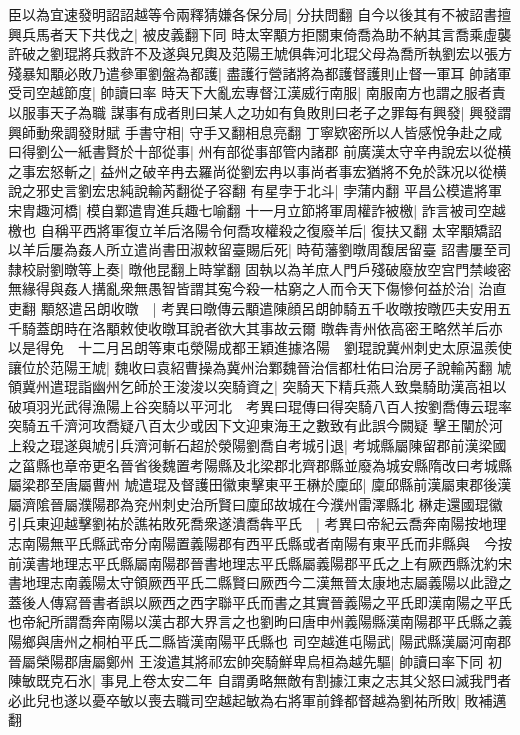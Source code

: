 臣以為宜速發明詔詔越等令兩釋猜嫌各保分局|{
	分扶問翻}
自今以後其有不被詔書擅興兵馬者天下共伐之|{
	被皮義翻下同}
時太宰顒方拒關東倚喬為助不納其言喬乘虛襲許破之劉琨將兵救許不及遂與兄輿及范陽王虓俱犇河北琨父母為喬所執劉宏以張方殘暴知顒必敗乃遣參軍劉盤為都護|{
	盡護行營諸將為都護督護則止督一軍耳}
帥諸軍受司空越節度|{
	帥讀曰率}
時天下大亂宏專督江漢威行南服|{
	南服南方也謂之服者責以服事天子為職}
謀事有成者則曰某人之功如有負敗則曰老子之罪每有興發|{
	興發謂興師動衆調發財賦}
手書守相|{
	守手又翻相息亮翻}
丁寧欵密所以人皆感悅争赴之咸曰得劉公一紙書賢於十部從事|{
	州有部從事部管内諸郡}
前廣漢太守辛冉說宏以從横之事宏怒斬之|{
	益州之破辛冉去羅尚從劉宏冉以事尚者事宏猶將不免於誅况以從横說之邪史言劉宏忠純說輸芮翻從子容翻}
有星孛于北斗|{
	孛蒲内翻}
平昌公模遣將軍宋胄趣河橋|{
	模自鄴遣胄進兵趣七喻翻}
十一月立節將軍周權詐被檄|{
	詐言被司空越檄也}
自稱平西將軍復立羊后洛陽令何喬攻權殺之復廢羊后|{
	復扶又翻}
太宰顒矯詔以羊后屢為姦人所立遣尚書田淑敕留臺賜后死|{
	時荀藩劉暾周馥居留臺}
詔書屢至司隸校尉劉暾等上奏|{
	暾他昆翻上時掌翻}
固執以為羊庶人門戶殘破廢放空宫門禁峻密無緣得與姦人搆亂衆無愚智皆謂其寃今殺一枯窮之人而令天下傷慘何益於治|{
	治直吏翻}
顒怒遣呂朗收暾　|{
	考異曰暾傳云顒遣陳顔呂朗帥騎五千收暾按暾匹夫安用五千騎蓋朗時在洛顒敕使收暾耳說者欲大其事故云爾}
暾犇青州依高密王略然羊后亦以是得免　十二月呂朗等東屯滎陽成都王穎進據洛陽　劉琨說冀州刺史太原温羨使讓位於范陽王虓|{
	魏收曰袁紹曹操為冀州治鄴魏晉治信都杜佑曰治房子說輸芮翻}
虓領冀州遣琨詣幽州乞師於王浚浚以突騎資之|{
	突騎天下精兵燕人致梟騎助漢高祖以破項羽光武得漁陽上谷突騎以平河北　考異曰琨傳曰得突騎八百人按劉喬傳云琨率突騎五千濟河攻喬疑八百太少或因下文迎東海王之數致有此誤今闕疑}
擊王闡於河上殺之琨遂與虓引兵濟河斬石超於滎陽劉喬自考城引退|{
	考城縣屬陳留郡前漢梁國之菑縣也章帝更名晉省後魏置考陽縣及北梁郡北齊郡縣並廢為城安縣隋改曰考城縣屬梁郡至唐屬曹州}
虓遣琨及督護田徽東擊東平王楙於廩邱|{
	廩邱縣前漢屬東郡後漢屬濟隂晉屬濮陽郡為兖州刺史治所賢曰廩邱故城在今濮州雷澤縣北}
楙走還國琨徽引兵東迎越擊劉祐於譙祐敗死喬衆遂潰喬犇平氏　|{
	考異曰帝紀云喬奔南陽按地理志南陽無平氏縣武帝分南陽置義陽郡有西平氏縣或者南陽有東平氏而非縣與　今按前漢書地理志平氏縣屬南陽郡晉書地理志平氏縣屬義陽郡平氏之上有厥西縣沈約宋書地理志南義陽太守領厥西平氏二縣賢曰厥西今二漢無晉太康地志屬義陽以此證之蓋後人傳寫晉書者誤以厥西之西字聯平氏而書之其實晉義陽之平氏即漢南陽之平氏也帝紀所謂喬奔南陽以漢古郡大界言之也劉昫曰唐申州義陽縣漢南陽郡平氏縣之義陽鄉與唐州之桐柏平氏二縣皆漢南陽平氏縣也}
司空越進屯陽武|{
	陽武縣漢屬河南郡晉屬榮陽郡唐屬鄭州}
王浚遣其將祁宏帥突騎鮮卑烏桓為越先驅|{
	帥讀曰率下同}
初陳敏既克石氷|{
	事見上卷太安二年}
自謂勇略無敵有割據江東之志其父怒曰滅我門者必此兒也遂以憂卒敏以喪去職司空越起敏為右將軍前鋒都督越為劉祐所敗|{
	敗補邁翻}
